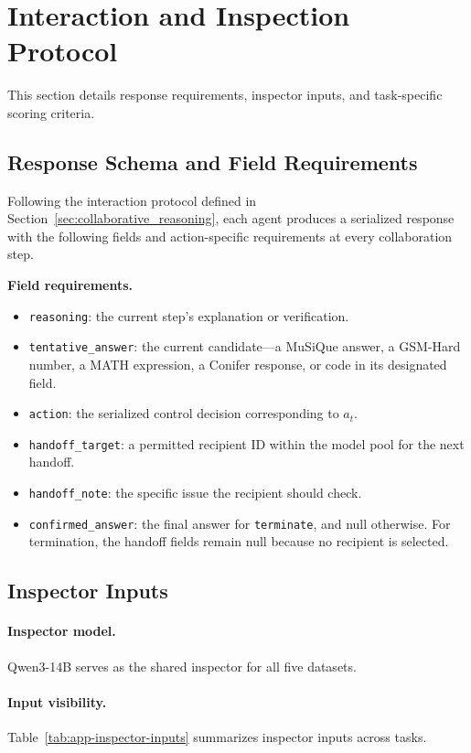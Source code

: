 \section{Interaction and Inspection Protocol}
\label{app:protocol}

This section details response requirements, inspector inputs, and task-specific scoring criteria.

\FloatBarrier
\subsection{Response Schema and Field Requirements}
\label{app:output_schema}
Following the interaction protocol defined in Section~\ref{sec:collaborative_reasoning}, each agent produces a serialized response with the following fields and action-specific requirements at every collaboration step.

\noindent\textbf{Field requirements.}
\begin{itemize}
    \item \texttt{reasoning}: the current step's explanation or verification.
    \item \texttt{tentative\_answer}: the current candidate---a MuSiQue answer, a GSM-Hard number, a MATH expression, a Conifer response, or code in its designated field.
    \item \texttt{action}: the serialized control decision corresponding to $a_t$.
    \item \texttt{handoff\_target}: a permitted recipient ID within the model pool for the next handoff.
    \item \texttt{handoff\_note}: the specific issue the recipient should check.
    \item \texttt{confirmed\_answer}: the final answer for \texttt{terminate}, and null otherwise. For termination, the handoff fields remain null because no recipient is selected.
\end{itemize}
\FloatBarrier
\subsection{Inspector Inputs}

\paragraph{Inspector model.}
Qwen3-14B serves as the shared inspector for all five datasets.

\paragraph{Input visibility.}
Table~\ref{tab:app-inspector-inputs} summarizes inspector inputs across tasks.

